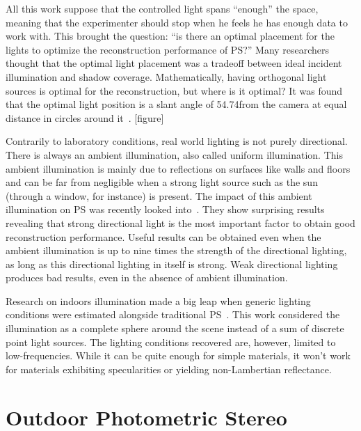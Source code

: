 All this work suppose that the controlled light spans ``enough'' the space, meaning that the experimenter should stop when he feels he has enough data to work with. This brought the question: ``is there an optimal placement for the lights to optimize the reconstruction performance of PS?'' Many researchers thought that the optimal light placement was a tradeoff between ideal incident illumination and shadow coverage. Mathematically, having orthogonal light sources is optimal for the reconstruction, but where is it optimal? It was found that the optimal light position is a slant angle of 54.74\degree from the camera at equal distance in circles around it~\cite{spence-iwtas-03,drbohlav-iccv-05}. [figure]

Contrarily to laboratory conditions, real world lighting is not purely directional. There is always an ambient illumination, also called uniform illumination. This ambient illumination is mainly due to reflections on surfaces like walls and floors and can be far from negligible when a strong light source such as the sun (through a window, for instance) is present. The impact of this ambient illumination on PS was recently looked into~\cite{Angelopoulou2013}. They show surprising results revealing that strong directional light is the most important factor to obtain good reconstruction performance. Useful results can be obtained even when the ambient illumination is up to nine times the strength of the directional lighting, as long as this directional lighting in itself is strong. Weak directional lighting produces bad results, even in the absence of ambient illumination.

Research on indoors illumination made a big leap when generic lighting conditions were estimated alongside traditional PS~\cite{basri-ijcv-2007}. This work considered the illumination as a complete sphere around the scene instead of a sum of discrete point light sources. The lighting conditions recovered are, however, limited to low-frequencies. While it can be quite enough for simple materials, it won't work for materials exhibiting specularities or yielding non-Lambertian reflectance.



\section{Outdoor Photometric Stereo}

